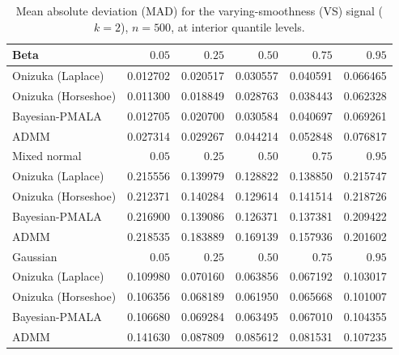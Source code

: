 \begin{table}[!htbp]
\centering
\small
\caption{Mean absolute deviation (MAD) for the varying-smoothness (VS) signal ($k=2$), $n=500$, at interior quantile levels.}
\label{tab:vs_int_mad}
\begin{tabular}{lrrrrr}
\toprule
Beta & $0.05$ & $0.25$ & $0.50$ & $0.75$ & $0.95$ \\
\midrule
Onizuka (Laplace) & 0.012702 & 0.020517 & 0.030557 & 0.040591 & 0.066465 \\
Onizuka (Horseshoe) & 0.011300 & 0.018849 & 0.028763 & 0.038443 & 0.062328 \\
Bayesian-PMALA & 0.012705 & 0.020700 & 0.030584 & 0.040697 & 0.069261 \\
ADMM & 0.027314 & 0.029267 & 0.044214 & 0.052848 & 0.076817 \\
\midrule
Mixed normal & $0.05$ & $0.25$ & $0.50$ & $0.75$ & $0.95$ \\
\midrule
Onizuka (Laplace) & 0.215556 & 0.139979 & 0.128822 & 0.138850 & 0.215747 \\
Onizuka (Horseshoe) & 0.212371 & 0.140284 & 0.129614 & 0.141514 & 0.218726 \\
Bayesian-PMALA & 0.216900 & 0.139086 & 0.126371 & 0.137381 & 0.209422 \\
ADMM & 0.218535 & 0.183889 & 0.169139 & 0.157936 & 0.201602 \\
\midrule
Gaussian & $0.05$ & $0.25$ & $0.50$ & $0.75$ & $0.95$ \\
\midrule
Onizuka (Laplace) & 0.109980 & 0.070160 & 0.063856 & 0.067192 & 0.103017 \\
Onizuka (Horseshoe) & 0.106356 & 0.068189 & 0.061950 & 0.065668 & 0.101007 \\
Bayesian-PMALA & 0.106680 & 0.069284 & 0.063495 & 0.067010 & 0.104355 \\
ADMM & 0.141630 & 0.087809 & 0.085612 & 0.081531 & 0.107235 \\
\bottomrule
\end{tabular}
\end{table}
